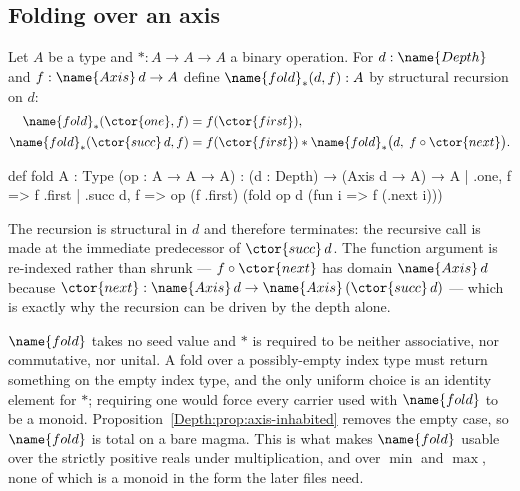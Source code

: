 \subsection{Folding over an axis}

\begin{definition}\label{Depth:def:fold}
Let $A$ be a type and $\ast : A \to A \to A$ a binary operation.  For
$d : \name{Depth}$ and $f : \name{Axis}\,d \to A$ define $\name{fold}_{\ast}(d, f) : A$ by
structural recursion on $d$:
\begin{align}
  \name{fold}_{\ast}(\ctor{one}, f)
    &= f(\ctor{first}), \label{Depth:eq:fold-one}\\
  \name{fold}_{\ast}(\ctor{succ}\, d, f)
    &= f(\ctor{first}) \ast \name{fold}_{\ast}\bigl(d,\; f \circ \ctor{next}\bigr).
      \label{Depth:eq:fold-succ}
\end{align}
\end{definition}

\begin{leancode}
def fold {A : Type} (op : A → A → A) :
    (d : Depth) → (Axis d → A) → A
  | .one, f => f .first
  | .succ d, f => op (f .first) (fold op d (fun i => f (.next i)))
\end{leancode}

The recursion is structural in $d$ and therefore terminates: the recursive
call is made at the immediate predecessor of $\ctor{succ}\, d$.  The function argument
is re-indexed rather than shrunk --- $f \circ \ctor{next}$ has domain $\name{Axis}\,d$
because $\ctor{next} : \name{Axis}\,d \to \name{Axis}\,(\ctor{succ}\, d)$ --- which is exactly why the
recursion can be driven by the depth alone.

\begin{designnote}\label{Depth:note:no-identity}
$\name{fold}$ takes no seed value and $\ast$ is required to be neither associative,
nor commutative, nor unital.  A fold over a possibly-empty index type must
return something on the empty index type, and the only uniform choice is an
identity element for $\ast$; requiring one would force every carrier used with
$\name{fold}$ to be a monoid.  Proposition~\ref{Depth:prop:axis-inhabited} removes the
empty case, so $\name{fold}$ is total on a bare magma.  This is what makes $\name{fold}$
usable over the strictly positive reals under multiplication, and over
$\min$ and $\max$, none of which is a monoid in the form the later files need.
\end{designnote}

